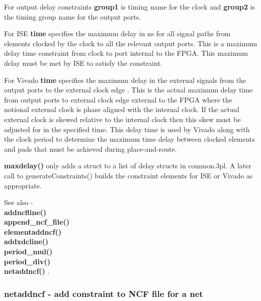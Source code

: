             For output delay constraints {\bf group1} is timing name for the
            clock and {\bf group2} is the timing group name for the output
            ports.
            
            For ISE {\bf time} specifies the maximum delay in ns for all signal
            paths from elements clocked by the clock to all the relevant output
            ports. This is a maximum delay time constraint from clock to port
            internal to the FPGA. This maximum delay must be met by ISE to
            satisfy the constraint.
            
            For Vivado {\bf time} specifies the maximum delay in the external
            signals from the output ports to the external clock edge . This is
            the actual maximum delay time from output ports to external clock
            edge external to the FPGA where the notional external clock is phase
            aligned with the internal clock. If the actual external clock is
            skewed relative to the internal clock then this skew must be
            adjusted for in the specified time. This delay time is used by
            Vivado along with the clock period to determine the maximum time
            delay between clocked elements and pads that must be achieved during
            place-and-route.
            
            {\bf maxdelay()} only adds a struct to a list of delay structs
            in common.3pl. A later call to generateConstraints() builds
            the constraint elements for ISE or Vivado as appropriate.

            See also - \\         
            {\bf addncfline()} \\
            {\bf append\_ncf\_file()} \\
            {\bf elementaddncf()} \\
            {\bf addxdcline()} \\
            {\bf period\_mul()} \\
            {\bf period\_div()} \\
            {\bf netaddncf()} .





        \subsubsection{netaddncf - add constraint to NCF file for a net}\label{sec:lpnetaddncf}
            
